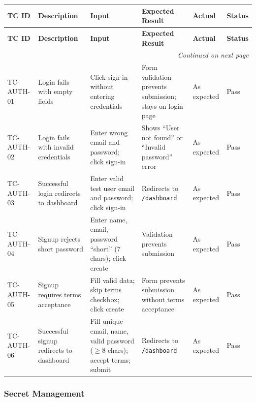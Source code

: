 \documentclass[12pt,a4paper]{article}
\begin{document}
{\footnotesize
\begin{longtable}{@{}p{1.4cm}p{2.6cm}p{3.3cm}p{3.8cm}p{1.4cm}p{0.8cm}@{}}
  \toprule
  \textbf{TC ID} & \textbf{Description} & \textbf{Input} & \textbf{Expected Result} & \textbf{Actual} & \textbf{Status} \\
  \midrule
  \endfirsthead
  \toprule
  \textbf{TC ID} & \textbf{Description} & \textbf{Input} & \textbf{Expected Result} & \textbf{Actual} & \textbf{Status} \\
  \midrule
  \endhead
  \hline
  \multicolumn{6}{r}{\textit{Continued on next page}} \\
  \endfoot
  \bottomrule
  \endlastfoot

  TC-AUTH-01 &
  Login fails with empty fields &
  Click sign-in without entering credentials &
  Form validation prevents submission; stays on login page &
  As expected &
  Pass \\
  \hline

  TC-AUTH-02 &
  Login fails with invalid credentials &
  Enter wrong email and password; click sign-in &
  Shows ``User not found'' or ``Invalid password'' error &
  As expected &
  Pass \\
  \hline

  TC-AUTH-03 &
  Successful login redirects to dashboard &
  Enter valid test user email and password; click sign-in &
  Redirects to \texttt{/dashboard} &
  As expected &
  Pass \\
  \hline

  TC-AUTH-04 &
  Signup rejects short password &
  Enter name, email, password ``short'' (7 chars); click create &
  Validation prevents submission &
  As expected &
  Pass \\
  \hline

  TC-AUTH-05 &
  Signup requires terms acceptance &
  Fill valid data; skip terms checkbox; click create &
  Form prevents submission without terms acceptance &
  As expected &
  Pass \\
  \hline

  TC-AUTH-06 &
  Successful signup redirects to dashboard &
  Fill unique email, name, valid password ($\geq$8 chars); accept terms; submit &
  Redirects to \texttt{/dashboard} &
  As expected &
  Pass \\
\end{longtable}
}

\subsubsection{Secret Management}
\end{document}
